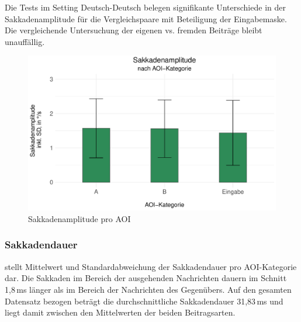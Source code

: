 Die Tests im Setting Deutsch-Deutsch belegen signifikante Unterschiede in der Sakkadenamplitude für die Vergleichspaare mit Beteiligung der Eingabemaske. Die vergleichende Untersuchung der eigenen vs. fremden Beiträge bleibt unauffällig.


\begin{figure}
	\includegraphics[width=.85\textwidth]{Figures/EyeTracking/DD/ggplot_DD-boxplot_sacamp_AOI_de}
	\caption{Sakkadenamplitude pro AOI}
	\label{K6:fig:DeDe:sacamp-box}
\end{figure}



\subsubsection{Sakkadendauer}
\label{K6:subsubsec:sacdur:DD}\largerpage[2]


 stellt Mittelwert und Standardabweichung der Sakkadendauer pro AOI-Kategorie dar. Die Sakkaden im Bereich der ausgehenden Nachrichten dauern im Schnitt 1,8\,ms länger als im Bereich der Nachrichten des Gegenübers. Auf den gesamten Datensatz bezogen beträgt die durchschnittliche Sakkadendauer 31,83\,ms und liegt damit zwischen den Mittelwerten der beiden Beitragsarten.

